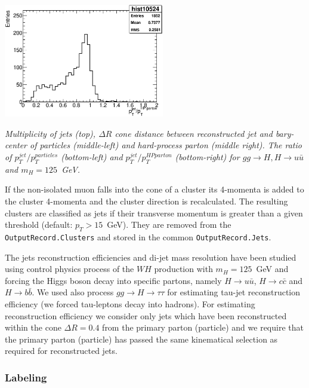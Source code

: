 \begin{Fighere}
\begin{center}
{   \includegraphics[width=7.0cm,angle=0]{plot-dPT-jetHPparton.eps}
}
\end{center}
\caption{\em
Multiplicity of jets (top), $\Delta R$ cone distance between reconstructed jet
and bary-center of particles (middle-left) and hard-process parton (middle right).
The ratio of $p_T^{jet}/p_T^{particles}$ (bottom-left) and
$p_T^{jet}/p_T^{HP parton}$ (bottom-right) for $gg \to H, H \to u \bar u$ and 
$m_{H} = 125$~GeV.
\label{FS2:5}} 
\end{Fighere}
\newpage


 If the non-isolated muon falls into the cone of a
cluster its 4-momenta  is added to the cluster 4-momenta and the
cluster direction is recalculated.
The resulting clusters are classified as jets if their transverse momentum
is greater than a given threshold (default: $p_T > 15$~GeV).
They are removed from the  {\tt OutputRecord.Clusters} and stored in the 
common  {\tt OutputRecord.Jets}.

The jets reconstruction efficiencies and di-jet mass resolution
have been studied using control physics process of the $WH$ production
with $m_H=125$~GeV and forcing the Higgs boson decay into specific
partons, namely $H \to u \bar u$, $H \to c \bar c$  and $H \to b \bar b$.
We used also process $gg \to H \to \tau \tau$ for estimating tau-jet
reconstruction efficiency (we forced tau-leptons decay into hadrons).
For estimating reconstruction efficiency we consider only jets which
have been reconstructed within the cone $\Delta R = 0.4$ from the
primary parton (particle) and we require that the primary parton
(particle) has passed
the same kinematical selection as required for reconstructed jets.

\boldmath 
\subsubsection{Labeling}
\unboldmath


